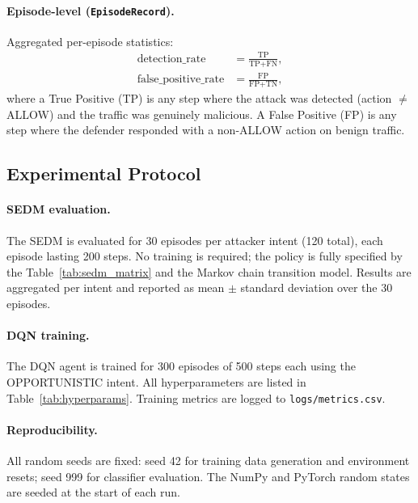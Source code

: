 \paragraph{Episode-level (\texttt{EpisodeRecord}).}
Aggregated per-episode statistics:
%
\begin{align}
  \text{detection\_rate} &= \frac{\text{TP}}{\text{TP} + \text{FN}}, \\
  \text{false\_positive\_rate} &= \frac{\text{FP}}{\text{FP} + \text{TN}},
\end{align}
%
where a True Positive (TP) is any step where the attack was detected
(action $\neq$ ALLOW) and the traffic was genuinely malicious.
A False Positive (FP) is any step where the defender responded with a
non-ALLOW action on benign traffic.

\subsection{Experimental Protocol}

\paragraph{SEDM evaluation.}
The SEDM is evaluated for 30 episodes per attacker intent (120 total),
each episode lasting 200 steps.
No training is required; the policy is fully specified by the
Table~\ref{tab:sedm_matrix} and the Markov chain transition model.
Results are aggregated per intent and reported as mean $\pm$ standard
deviation over the 30 episodes.

\paragraph{DQN training.}
The DQN agent is trained for 300 episodes of 500 steps each using the
OPPORTUNISTIC intent.
All hyperparameters are listed in Table~\ref{tab:hyperparams}.
Training metrics are logged to \texttt{logs/metrics.csv}.

\paragraph{Reproducibility.}
All random seeds are fixed: seed 42 for training data generation and
environment resets; seed 999 for classifier evaluation.
The NumPy and PyTorch random states are seeded at the start of each run.
